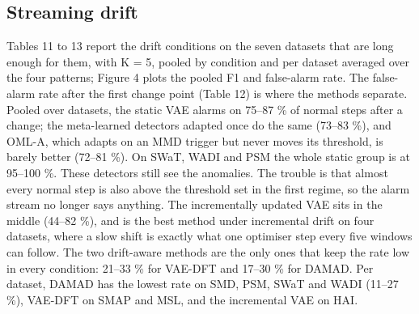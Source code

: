 \hypertarget{streaming-drift}{%
\subsection{Streaming drift}\label{streaming-drift}}

Tables 11 to 13 report the drift conditions on the seven datasets that are long enough for them, with K = 5, pooled by condition and per dataset averaged over the four patterns; Figure 4 plots the pooled F1 and false-alarm rate. The false-alarm rate after the first change point (Table 12) is where the methods separate. Pooled over datasets, the static VAE alarms on 75--87 \% of normal steps after a change; the meta-learned detectors adapted once do the same (73--83 \%), and OML-A, which adapts on an MMD trigger but never moves its threshold, is barely better (72--81 \%). On SWaT, WADI and PSM the whole static group is at 95--100 \%. These detectors still see the anomalies. The trouble is that almost every normal step is also above the threshold set in the first regime, so the alarm stream no longer says anything. The incrementally updated VAE sits in the middle (44--82 \%), and is the best method under incremental drift on four datasets, where a slow shift is exactly what one optimiser step every five windows can follow. The two drift-aware methods are the only ones that keep the rate low in every condition: 21--33 \% for VAE-DFT and 17--30 \% for DAMAD. Per dataset, DAMAD has the lowest rate on SMD, PSM, SWaT and WADI (11--27 \%), VAE-DFT on SMAP and MSL, and the incremental VAE on HAI.

